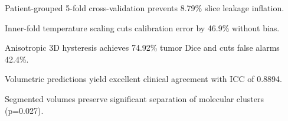 \begin{highlights}
  \item Patient-grouped 5-fold cross-validation prevents 8.79\% slice leakage inflation.
  \item Inner-fold temperature scaling cuts calibration error by 46.9\% without bias.
  \item Anisotropic 3D hysteresis achieves 74.92\% tumor Dice and cuts false alarms 42.4\%.
  \item Volumetric predictions yield excellent clinical agreement with ICC of 0.8894.
  \item Segmented volumes preserve significant separation of molecular clusters (p=0.027).
\end{highlights}
